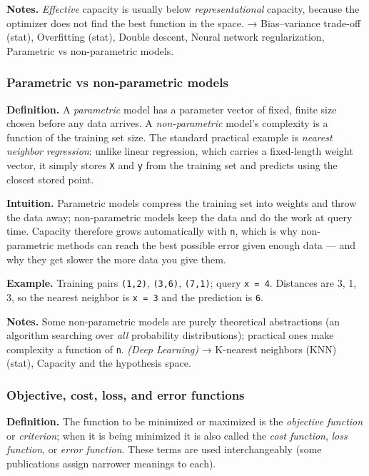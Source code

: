 \documentclass[
  10pt,
  letterpaper,
  onecolumn]{article}
\begin{document}
\textbf{Notes.} \emph{Effective} capacity is usually below
\emph{representational} capacity, because the optimizer does not find
the best function in the space. → Bias--variance trade-off (stat),
Overfitting (stat), Double descent, Neural network regularization,
Parametric vs non-parametric models.

\hypertarget{parametric-vs-non-parametric-models}{%
\subsubsection{Parametric vs non-parametric
models}\label{parametric-vs-non-parametric-models}}

\textbf{Definition.} A \emph{parametric} model has a parameter vector of
fixed, finite size chosen before any data arrives. A
\emph{non-parametric} model's complexity is a function of the training
set size. The standard practical example is \emph{nearest neighbor
regression}: unlike linear regression, which carries a fixed-length
weight vector, it simply stores \texttt{X} and \texttt{y} from the
training set and predicts using the closest stored point.

\textbf{Intuition.} Parametric models compress the training set into
weights and throw the data away; non-parametric models keep the data and
do the work at query time. Capacity therefore grows automatically with
\texttt{n}, which is why non-parametric methods can reach the best
possible error given enough data --- and why they get slower the more
data you give them.

\textbf{Example.} Training pairs \texttt{(1,2)}, \texttt{(3,6)},
\texttt{(7,1)}; query \texttt{x\ =\ 4}. Distances are 3, 1, 3, so the
nearest neighbor is \texttt{x\ =\ 3} and the prediction is \texttt{6}.

\textbf{Notes.} Some non-parametric models are purely theoretical
abstractions (an algorithm searching over \emph{all} probability
distributions); practical ones make complexity a function of \texttt{n}.
\emph{(Deep Learning)} → K-nearest neighbors (KNN) (stat), Capacity and
the hypothesis space.

\hypertarget{objective-cost-loss-and-error-functions}{%
\subsubsection{Objective, cost, loss, and error
functions}\label{objective-cost-loss-and-error-functions}}

\textbf{Definition.} The function to be minimized or maximized is the
\emph{objective function} or \emph{criterion}; when it is being
minimized it is also called the \emph{cost function}, \emph{loss
function}, or \emph{error function}. These terms are used
interchangeably (some publications assign narrower meanings to each).
\end{document}
